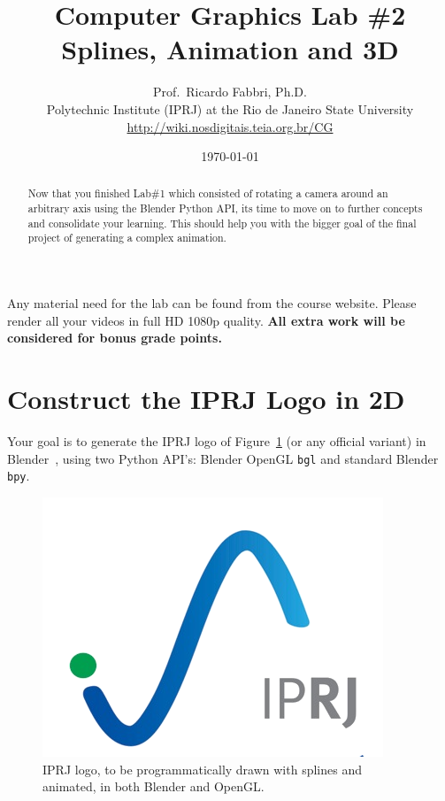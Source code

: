 \documentclass[a4paper]{article}
\begin{document}
\title{\textsf{Computer Graphics Lab \#2\\ Splines, Animation and 3D}
} 

\author{Prof.\ Ricardo Fabbri, Ph.D.\\[1em]
\small{Polytechnic Institute (IPRJ) at the Rio de Janeiro State University}\\
\small{\url{http://wiki.nosdigitais.teia.org.br/CG}}
}
 

\date{\today}
\maketitle
\begin{abstract}
Now that you finished Lab\#1 which consisted of rotating a camera around an
arbitrary axis using the Blender Python API, its time to move on to further concepts and consolidate your
learning. This should help you with the bigger goal of the final project
of generating a complex animation.
\end{abstract}
\vspace{2em}

Any material need for the lab can be found from the course
website. Please render all your videos in full HD 1080p quality.
\textbf{All extra work will be considered for bonus grade points.}

\section{Construct the IPRJ Logo in 2D}
Your goal is to generate the IPRJ logo of Figure~\ref{fig:iprj:logo} (or any
official variant) in Blender~\cite{blender},
using two Python API's: Blender OpenGL \texttt{bgl} and standard Blender \texttt{bpy}. 
\begin{figure}
\centering
\includegraphics[width=0.5\linewidth]{figs/logo-iprj2.png}%
\caption{%
IPRJ logo, to be programmatically drawn with splines and animated, in both
Blender and OpenGL.
}\label{fig:iprj:logo}
\end{figure}
\end{document}
